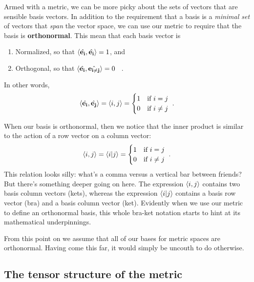\documentclass[12pt]{article}
\begin{document}
Armed with a metric, we can be more picky about the sets of vectors that are sensible basis vectors. In addition to the requirement that a basis is a \emph{minimal set} of vectors that \emph{span} the vector space, we can use our metric to require that the basis is \textbf{orthonormal}. This mean that each basis vector is
\begin{enumerate}
\item Normalized, so that $\langle \hat{\mathbf{e_i}},\hat{\mathbf{e_i}}\rangle = 1$, and
\item Orthogonal, so that $\langle \hat{\mathbf{e_i}},\hat{\mathbf{e_{i\neq j}}}\rangle = 0$ \ .
\end{enumerate}
In other words, 
\begin{align}
    \langle \hat{\mathbf{e_i}}, \hat{\mathbf{e_j}} \rangle 
    = 
    \langle i , j \rangle
    = 
    \begin{cases}
    1 & \textnormal{if } i=j \\
    0 & \textnormal{if } i\neq j
    \end{cases} \ .
\end{align}

When our basis is orthonormal, then we notice that the inner product is similar to the action of a row vector on a column vector:
\begin{align}
    \langle i , j \rangle = \langle i | j \rangle 
    = 
    \begin{cases}
    1 & \textnormal{if } i=j \\
    0 & \textnormal{if } i\neq j
    \end{cases} 
    \ .
    \label{eq:basis:metric:row}
\end{align}
This relation looks silly: what's a comma versus a vertical bar between friends? But there's something deeper going on here. The expression $\langle i , j \rangle $ contains two basis column vectors (kets), whereas the expression $\langle i | j \rangle $ contains a basis row vector (bra) and a basis column vector (ket). Evidently when we use our metric to define an orthonormal basis, this whole bra-ket notation starts to hint at its mathematical underpinnings. 

From this point on we assume that all of our bases for metric spaces are orthonormal. Having come this far, it would simply be uncouth to do otherwise.


\subsection{The tensor structure of the metric}
\end{document}
